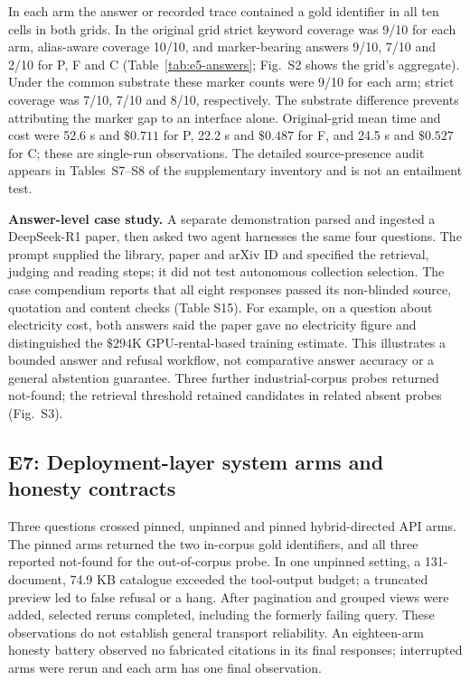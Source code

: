 In each arm the answer or recorded trace contained a gold identifier in all
ten cells in both grids. In the
original grid strict keyword coverage was 9/10 for each arm, alias-aware
coverage 10/10, and marker-bearing answers 9/10, 7/10 and 2/10 for P, F and
C (Table~\ref{tab:e5-answers}; Fig.~S2 shows the grid's aggregate). Under the common substrate these marker
counts were 9/10 for each arm; strict coverage was 7/10, 7/10 and 8/10,
respectively. The substrate difference prevents attributing the marker gap to
an interface alone. Original-grid mean time and cost were 52.6 s and $\$0.711$
for P, 22.2 s and $\$0.487$ for F, and 24.5 s and $\$0.527$ for C; these are
single-run observations. The detailed source-presence audit appears in
Tables~S7--S8 of the supplementary inventory and is not an entailment test.

\textbf{Answer-level case study.} A separate demonstration parsed and ingested
a DeepSeek-R1 paper, then asked two agent harnesses the same four questions.
The prompt supplied the library, paper and arXiv ID and specified the retrieval,
judging and reading steps; it did not test autonomous collection selection.
The case compendium reports that all eight responses passed its non-blinded
source, quotation and content checks (Table S15). For example, on a question
about electricity cost, both answers said the paper gave no electricity figure
and distinguished the $\$294$K GPU-rental-based training estimate. This
illustrates a bounded answer and refusal workflow, not comparative answer
accuracy or a general abstention guarantee. Three further
industrial-corpus probes returned not-found; the retrieval threshold retained
candidates in related absent probes (Fig.~S3).

\subsection{E7: Deployment-layer system arms and honesty contracts}
\label{sec:sysarms}
Three questions crossed pinned, unpinned and pinned hybrid-directed API arms.
The pinned arms returned the two in-corpus gold identifiers, and all three
reported not-found for the out-of-corpus probe. In one unpinned setting, a
131-document, 74.9 KB catalogue exceeded the tool-output budget; a truncated
preview led to false refusal or a hang. After pagination and grouped views were
added, selected reruns completed, including the formerly failing query. These
observations do not establish general transport reliability. An eighteen-arm
honesty battery observed no fabricated citations in its final responses;
interrupted arms were rerun and each arm has one final observation.


